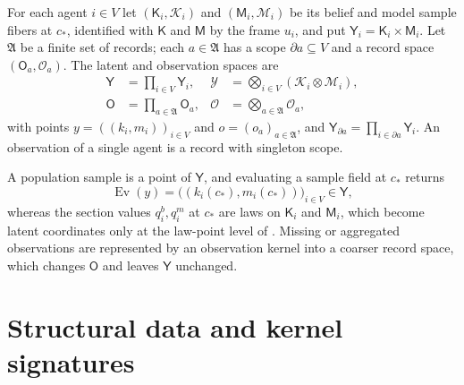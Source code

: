 For each agent $i\in V$ let $(\mathsf K_i,\mathscr K_i)$ and $(\mathsf M_i,\mathscr M_i)$ be its belief
and model sample fibers at $c_*$, identified with $\mathsf K$ and $\mathsf M$ by the frame $u_i$, and put
$\mathsf Y_i=\mathsf K_i\times\mathsf M_i$. Let $\mathfrak A$ be a finite set of records; each
$a\in\mathfrak A$ has a scope $\partial a\subseteq V$ and a record space $(\mathsf O_a,\mathscr O_a)$. The
latent and observation spaces are
\begin{align}
\mathsf Y&=\prod_{i\in V}\mathsf Y_i,
&\mathscr Y&=\bigotimes_{i\in V}(\mathscr K_i\otimes\mathscr M_i),
\label{eq:prob-latent-space}\\
\mathsf O&=\prod_{a\in\mathfrak A}\mathsf O_a,
&\mathscr O&=\bigotimes_{a\in\mathfrak A}\mathscr O_a,
\label{eq:prob-observation-space}
\end{align}
with points $y=((k_i,m_i))_{i\in V}$ and $o=(o_a)_{a\in\mathfrak A}$, and
$\mathsf Y_{\partial a}=\prod_{i\in\partial a}\mathsf Y_i$. An observation of a single agent is a record
with singleton scope.

A population sample is a point of $\mathsf Y$, and evaluating a sample field at $c_*$ returns
\begin{equation}
\operatorname{Ev}(y)=\bigl((k_i(c_*),m_i(c_*))\bigr)_{i\in V}\in\mathsf Y,
\label{eq:prob-evaluation-map}
\end{equation}
whereas the section values $q_i^b,q_i^m$ at $c_*$ are laws on $\mathsf K_i$ and $\mathsf M_i$, which become
latent coordinates only at the law-point level of . Missing or aggregated
observations are represented by an observation kernel into a coarser record space, which changes
$\mathsf O$ and leaves $\mathsf Y$ unchanged.

\section{Structural data and kernel signatures}
\label{sec:prob-structural}

